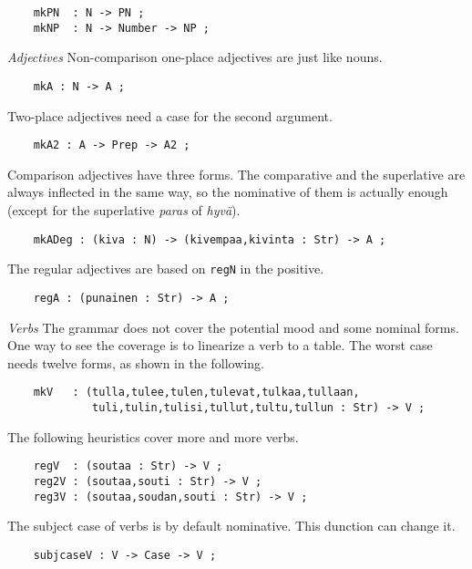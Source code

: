 \documentclass[11pt,a4paper]{article}
\newcommand{\subsubsubsection}[1]{\textit{#1}}
\begin{document}
\begin{verbatim}
    mkPN  : N -> PN ;
    mkNP  : N -> Number -> NP ; 
\end{verbatim}

\subsubsubsection{Adjectives}
Non-comparison one-place adjectives are just like nouns.

\begin{verbatim}
    mkA : N -> A ;
\end{verbatim}

Two-place adjectives need a case for the second argument.

\begin{verbatim}
    mkA2 : A -> Prep -> A2 ;
\end{verbatim}

Comparison adjectives have three forms. The comparative and the superlative
are always inflected in the same way, so the nominative of them is actually
enough (except for the superlative \textit{paras} of \textit{hyvä}).

\begin{verbatim}
    mkADeg : (kiva : N) -> (kivempaa,kivinta : Str) -> A ;
\end{verbatim}

The regular adjectives are based on \texttt{regN} in the positive.

\begin{verbatim}
    regA : (punainen : Str) -> A ;
\end{verbatim}

\subsubsubsection{Verbs}
The grammar does not cover the potential mood and some nominal
forms. One way to see the coverage is to linearize a verb to
a table.
The worst case needs twelve forms, as shown in the following.

\begin{verbatim}
    mkV   : (tulla,tulee,tulen,tulevat,tulkaa,tullaan,
             tuli,tulin,tulisi,tullut,tultu,tullun : Str) -> V ;
\end{verbatim}

The following heuristics cover more and more verbs.

\begin{verbatim}
    regV  : (soutaa : Str) -> V ;
    reg2V : (soutaa,souti : Str) -> V ;
    reg3V : (soutaa,soudan,souti : Str) -> V ;
\end{verbatim}

The subject case of verbs is by default nominative. This dunction can change it.

\begin{verbatim}
    subjcaseV : V -> Case -> V ;
\end{verbatim}
\end{document}
